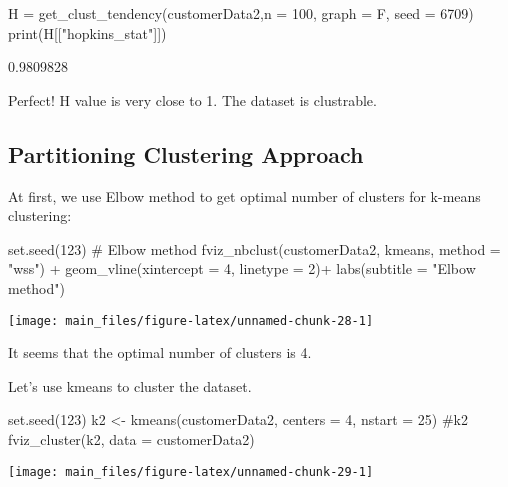 \begin{Schunk}
\begin{Sinput}
H =  get_clust_tendency(customerData2,n = 100, graph = F, seed = 6709)
print(H[["hopkins_stat"]])
\end{Sinput}
\begin{Soutput}
[1] 0.9809828
\end{Soutput}
\end{Schunk}

Perfect! H value is very close to 1. The dataset is clustrable.

\hypertarget{partitioning-clustering-approach}{%
\subsection{Partitioning Clustering
Approach}\label{partitioning-clustering-approach}}

At first, we use Elbow method to get optimal number of clusters for
k-means clustering:

\begin{Schunk}
\begin{Sinput}
set.seed(123)
# Elbow method
fviz_nbclust(customerData2, kmeans, method = "wss") +
    geom_vline(xintercept = 4, linetype = 2)+
  labs(subtitle = "Elbow method")
\end{Sinput}


\begin{center}\texttt{[image: main\_files/figure-latex/unnamed-chunk-28-1]} \end{center}

\end{Schunk}

It seems that the optimal number of clusters is 4.

Let's use kmeans to cluster the dataset.

\begin{Schunk}
\begin{Sinput}
set.seed(123)
k2 <- kmeans(customerData2, centers = 4, nstart = 25)
#k2
fviz_cluster(k2, data = customerData2)
\end{Sinput}


\begin{center}\texttt{[image: main\_files/figure-latex/unnamed-chunk-29-1]} \end{center}

\end{Schunk}

\begin{Schunk}
\end{Schunk}

